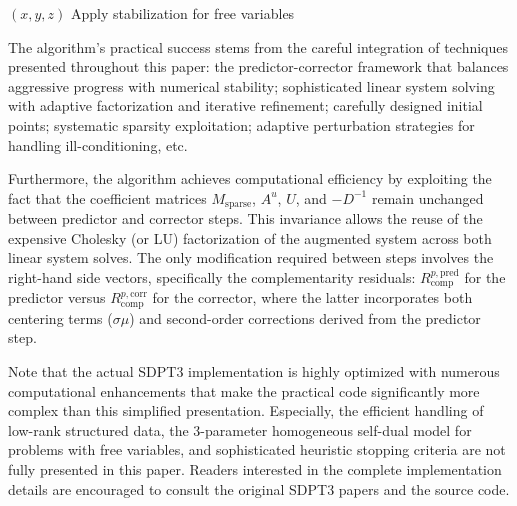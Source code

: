 \begin{algorithm}
\begin{algorithmic}[1]
    \STATE 
        \RETURN $(x, y, z)$
    \ENDIF
    \STATE Apply stabilization for free variables
\ENDFOR
\end{algorithmic}
\end{algorithm}

The algorithm's practical success stems from the careful integration of techniques presented throughout this paper: the predictor-corrector framework that balances aggressive progress with numerical stability; sophisticated linear system solving with adaptive factorization and iterative refinement; carefully designed initial points; systematic sparsity exploitation; adaptive perturbation strategies for handling ill-conditioning, etc.

Furthermore, the algorithm achieves computational efficiency by exploiting the fact that the coefficient matrices $M_{\text{sparse}}$, $A^u$, $U$, and $-D^{-1}$ remain unchanged between predictor and corrector steps. This invariance allows the reuse of the expensive Cholesky (or LU) factorization of the augmented system across both linear system solves. The only modification required between steps involves the right-hand side vectors, specifically the complementarity residuals: $R_{\text{comp}}^{p,\text{pred}}$ for the predictor versus $R_{\text{comp}}^{p,\text{corr}}$ for the corrector, where the latter incorporates both centering terms ($\sigma \mu$) and second-order corrections derived from the predictor step.

Note that the actual SDPT3 implementation is highly optimized with numerous computational enhancements that make the practical code significantly more complex than this simplified presentation. 
Especially, the efficient handling of low-rank structured data, the 3-parameter homogeneous self-dual model for problems with free variables, and sophisticated heuristic stopping criteria are not fully presented in this paper. 
Readers interested in the complete implementation details are encouraged to consult the original SDPT3 papers \cite{toh1999,Toh2012,tutuncu2003} and the source code.